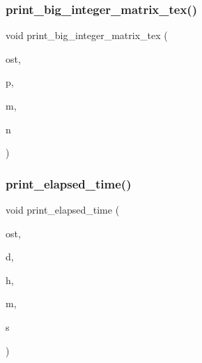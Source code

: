\mbox{\label{util_8_c_aadeb13683f1fa7a6a32c97ed539df296}} 
\subsubsection{\texorpdfstring{print\+\_\+big\+\_\+integer\+\_\+matrix\+\_\+tex()}{print\_big\_integer\_matrix\_tex()}}
{\footnotesize\ttfamily void print\+\_\+big\+\_\+integer\+\_\+matrix\+\_\+tex (\begin{DoxyParamCaption}\item[{ostream \&}]{ost,  }\item[{\mbox{\hyperlink{galois_8h_a09fddde158a3a20bd2dcadb609de11dc}{I\+NT}} $\ast$}]{p,  }\item[{\mbox{\hyperlink{galois_8h_a09fddde158a3a20bd2dcadb609de11dc}{I\+NT}}}]{m,  }\item[{\mbox{\hyperlink{galois_8h_a09fddde158a3a20bd2dcadb609de11dc}{I\+NT}}}]{n }\end{DoxyParamCaption})}

\mbox{\label{util_8_c_a92d16200f8fa968b259ca347e3549244}} 
\subsubsection{\texorpdfstring{print\+\_\+elapsed\+\_\+time()}{print\_elapsed\_time()}}
{\footnotesize\ttfamily void print\+\_\+elapsed\+\_\+time (\begin{DoxyParamCaption}\item[{ostream \&}]{ost,  }\item[{\mbox{\hyperlink{galois_8h_a09fddde158a3a20bd2dcadb609de11dc}{I\+NT}}}]{d,  }\item[{\mbox{\hyperlink{galois_8h_a09fddde158a3a20bd2dcadb609de11dc}{I\+NT}}}]{h,  }\item[{\mbox{\hyperlink{galois_8h_a09fddde158a3a20bd2dcadb609de11dc}{I\+NT}}}]{m,  }\item[{\mbox{\hyperlink{galois_8h_a09fddde158a3a20bd2dcadb609de11dc}{I\+NT}}}]{s }\end{DoxyParamCaption})}


